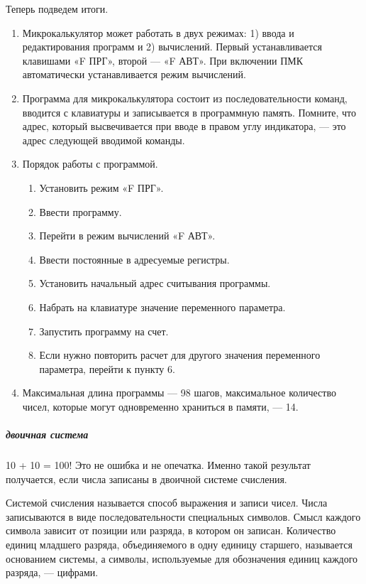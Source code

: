 \documentclass[11pt,a4paper,oneside]{article}
\providecommand{\tightlist}{\setlength{\itemsep}{0pt}\setlength{\parskip}{0pt}}
\begin{document}
Теперь подведем итоги.
\begin{enumerate}
\tightlist
\item Микрокалькулятор может работать в двух режимах: 1) ввода и редактирования программ и 2) вычислений. Первый устанавливается клавишами «F ПРГ», второй — «F АВТ». При включении ПМК автоматически устанавливается режим вычислений.
\item Программа для микрокалькулятора состоит из последовательности команд, вводится с клавиатуры и записывается в программную память. Помните, что адрес, который высвечивается при вводе в правом углу индикатора, — это адрес следующей вводимой команды.
\item Порядок работы с программой.
\begin{enumerate}[label=\arabic*)]
\item Установить режим «F ПРГ».
\item Ввести программу.
\item Перейти в режим вычислений «F АВТ».
\item Ввести постоянные в адресуемые регистры.
\item Установить начальный адрес считывания программы.
\item Набрать на клавиатуре значение переменного параметра.
\item Запустить программу на счет.
\item Если нужно повторить расчет для другого значения переменного параметра, перейти к пункту 6.
\end{enumerate}
\item Максимальная длина программы — 98 шагов, максимальное количество чисел, которые могут одновременно храниться в памяти, — 14.
\end{enumerate}

\subparagraph{двоичная система}
10 + 10 = 100!
Это не ошибка и не опечатка. Именно такой результат получается, если числа записаны в двоичной системе счисления.

Системой счисления называется способ выражения и записи чисел. Числа записываются в виде последовательности специальных символов. Смысл каждого символа зависит от позиции или разряда, в котором он записан. Количество единиц младшего разряда, объединяемого в одну единицу старшего, называется основанием системы, а символы, используемые для обозначения единиц каждого разряда, — цифрами.
\end{document}
